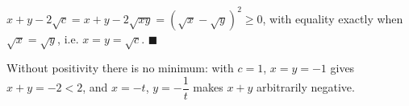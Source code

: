 $x+y-2\sqrt c=x+y-2\sqrt{xy}=\left(\sqrt x-\sqrt y\right)^2\ge0$, with equality exactly when $\sqrt x=\sqrt y$, i.e. $x=y=\sqrt c$. $\blacksquare$

Without positivity there is no minimum: with $c=1$, $x=y=-1$ gives $x+y=-2<2$, and $x=-t$, $y=-\dfrac1t$ makes $x+y$ arbitrarily negative.
